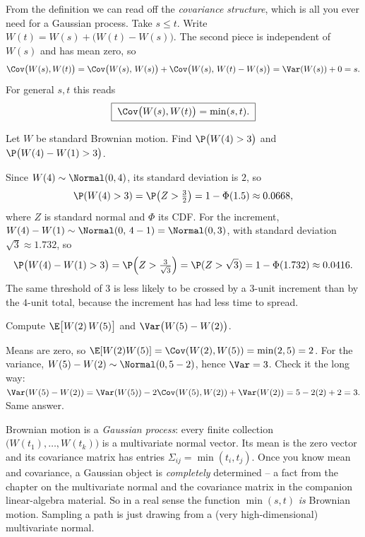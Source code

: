 From the definition we can read off the \emph{covariance structure}, which is all
you ever need for a Gaussian process. Take $s\le t$. Write $W(t) = W(s) +
\big(W(t)-W(s)\big)$. The second piece is independent of $W(s)$ and has mean
zero, so
\[
  \Cov\big(W(s),W(t)\big)
  = \Cov\big(W(s),\,W(s)\big) + \Cov\big(W(s),\,W(t)-W(s)\big)
  = \Var(W(s)) + 0 = s.
\]
For general $s,t$ this reads
\[
  \boxed{\;\Cov\big(W(s),W(t)\big) = \min(s,t).\;}
\]

\begin{example}
\label{ch29:ex-increments}
Let $W$ be standard Brownian motion. Find $\P\big(W(4) > 3\big)$ and
$\P\big(W(4) - W(1) > 3\big)$.

Since $W(4)\sim\Normal(0,4)$, its standard deviation is $2$, so
\[
  \P(W(4)>3) = \P\!\left(Z > \tfrac{3}{2}\right) = 1-\Phi(1.5)\approx 0.0668,
\]
where $Z$ is standard normal and $\Phi$ its CDF. For the increment,
$W(4)-W(1)\sim\Normal(0,\,4-1)=\Normal(0,3)$, with standard deviation $\sqrt3
\approx 1.732$, so
\[
  \P\big(W(4)-W(1)>3\big) = \P\!\left(Z > \tfrac{3}{\sqrt3}\right)
  = \P(Z>\sqrt3) = 1-\Phi(1.732)\approx 0.0416.
\]
The same threshold of $3$ is less likely to be crossed by a $3$-unit increment
than by the $4$-unit total, because the increment has had less time to spread.
\end{example}

\begin{example}
\label{ch29:ex-cov}
Compute $\E\big[W(2)\,W(5)\big]$ and $\Var\big(W(5)-W(2)\big)$.

Means are zero, so $\E[W(2)W(5)] = \Cov(W(2),W(5)) = \min(2,5) = 2$. For the
variance, $W(5)-W(2)\sim\Normal(0,5-2)$, hence $\Var = 3$. Check it the long way:
$\Var(W(5)-W(2)) = \Var(W(5)) - 2\Cov(W(5),W(2)) + \Var(W(2)) = 5 - 2(2) + 2 =
3.$ Same answer.
\end{example}

\begin{connectionbox}
Brownian motion is a \emph{Gaussian process}: every finite collection
$\big(W(t_1),\dots,W(t_k)\big)$ is a multivariate normal vector. Its mean is the
zero vector and its covariance matrix has entries $\Sigma_{ij}=\min(t_i,t_j)$.
Once you know mean and covariance, a Gaussian object is \emph{completely}
determined -- a fact from the chapter on the multivariate normal and the
covariance matrix in the companion linear-algebra material. So in a real sense
the function $\min(s,t)$ \emph{is} Brownian motion. Sampling a path is just
drawing from a (very high-dimensional) multivariate normal.
\end{connectionbox}

